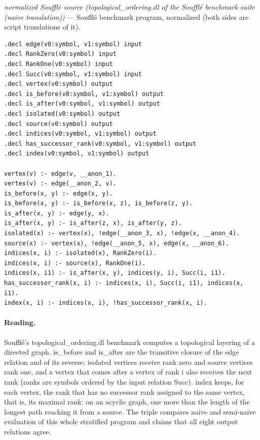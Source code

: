 \documentclass[10pt]{article}
\begin{document}
{\raggedright\textit{normalized Soufflé source (topological\_ordering.dl of the Soufflé benchmark suite (naive translation))} --- Soufflé benchmark program, normalized (both sides are script translations of it).\par}

\begin{Verbatim}[fontsize=\scriptsize,breaklines=true,breakanywhere=true,frame=single,framesep=1.5mm]
.decl edge(v0:symbol, v1:symbol) input
.decl RankZero(v0:symbol) input
.decl RankOne(v0:symbol) input
.decl Succ(v0:symbol, v1:symbol) input
.decl vertex(v0:symbol) output
.decl is_before(v0:symbol, v1:symbol) output
.decl is_after(v0:symbol, v1:symbol) output
.decl isolated(v0:symbol) output
.decl source(v0:symbol) output
.decl indices(v0:symbol, v1:symbol) output
.decl has_successor_rank(v0:symbol, v1:symbol) output
.decl index(v0:symbol, v1:symbol) output

vertex(v) :- edge(v, __anon_1).
vertex(v) :- edge(__anon_2, v).
is_before(x, y) :- edge(x, y).
is_before(x, y) :- is_before(x, z), is_before(z, y).
is_after(x, y) :- edge(y, x).
is_after(x, y) :- is_after(z, x), is_after(y, z).
isolated(x) :- vertex(x), !edge(__anon_3, x), !edge(x, __anon_4).
source(x) :- vertex(x), !edge(__anon_5, x), edge(x, __anon_6).
indices(x, i) :- isolated(x), RankZero(i).
indices(x, i) :- source(x), RankOne(i).
indices(x, i1) :- is_after(x, y), indices(y, i), Succ(i, i1).
has_successor_rank(x, i) :- indices(x, i), Succ(i, i1), indices(x, i1).
index(x, i) :- indices(x, i), !has_successor_rank(x, i).
\end{Verbatim}

\paragraph{Reading.} Soufflé's topological\_ordering.dl benchmark computes a topological layering of a directed graph. is\_before and is\_after are the transitive closure of the edge relation and of its reverse; isolated vertices receive rank zero and source vertices rank one, and a vertex that comes after a vertex of rank i also receives the next rank (ranks are symbols ordered by the input relation Succ). index keeps, for each vertex, the rank that has no successor rank assigned to the same vertex, that is, its maximal rank: on an acyclic graph, one more than the length of the longest path reaching it from a source. The triple compares naive and semi-naive evaluation of this whole stratified program and claims that all eight output relations agree.
\end{document}
